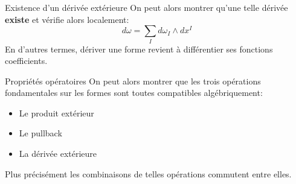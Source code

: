 \documentclass{beamer}
\begin{document}
        \begin{frame}{Existence d'un dérivée extérieure}
            On peut alors montrer qu'une telle dérivée \textbf{existe} et vérifie alors localement:
            \[
                d\omega = \sum_I d\omega_I \wedge dx^I
            \]
            En d'autres termes, dériver une forme revient à différentier ses fonctions coefficients.
        \end{frame}
        \begin{frame}{Propriétés opératoires}
            On peut alors montrer que les trois opérations fondamentales sur les formes sont toutes compatibles algébriquement:
            \begin{itemize}
               \item Le produit extérieur
               \item Le pullback
               \item La dérivée extérieure
            \end{itemize}
            Plus précisément les combinaisons de telles opérations commutent entre elles.
        \end{frame}
\end{document}

